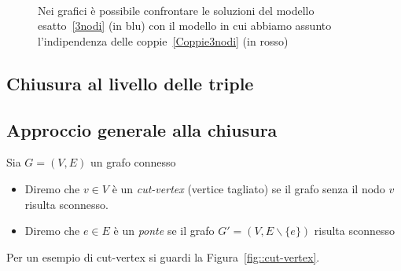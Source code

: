 \begin{figure}[!h]

\centering
\subfloat[][Nodo 1]
{\resizebox{0.45\textwidth}{!}{}}
 \quad 
\subfloat[][Nodo 2]
{\resizebox{0.45\textwidth}{!}{ }}
\\
\subfloat[][Nodo 3]
{\resizebox{0.45\textwidth}{!}
{}
}
\quad
\subfloat[][Prevalenza]
{\resizebox{0.45\textwidth}{!}
{}
}
\caption[Confronto tra modello esatto e chiuso alle coppie per~\ref{fig::3nodi}]{Nei grafici \`e possibile confrontare le soluzioni del modello esatto~\eqref{3nodi} (in blu) con il modello in cui abbiamo assunto l'indipendenza delle coppie~\eqref{Coppie3nodi} (in rosso)}
\label{fig::coppie3nodi}
\end{figure}
\subsection{Chiusura al livello delle triple}

\lipsum[6-10]

\subsection{Approccio generale alla chiusura}

Sia $G=(V,E)$ un grafo connesso
\begin{itemize}
\item Diremo che $v\in V$ \`e un \textit{cut-vertex} (vertice tagliato) se il grafo senza il nodo $v$ risulta sconnesso.
\item Diremo che $e\in E$ \`e un \textit{ponte} se il grafo $G'=(V, E\backslash\{e\})$ risulta sconnesso
\end{itemize}
Per un esempio di cut-vertex si guardi la Figura~\ref{fig::cut-vertex}.\newpage


